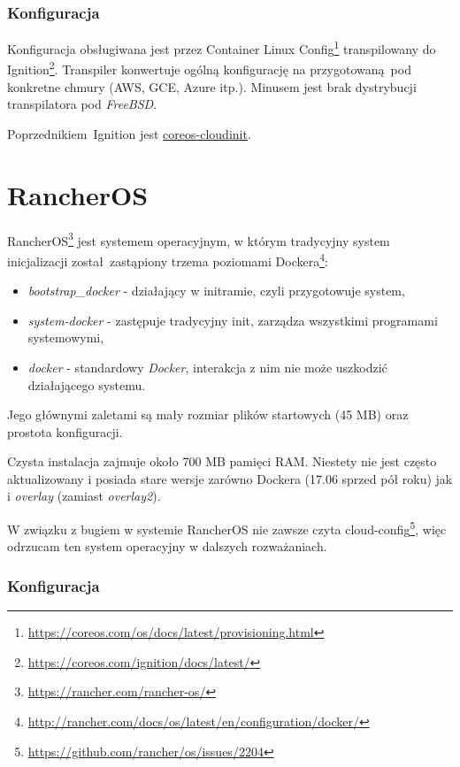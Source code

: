 \documentclass[a4paper,12pt,twoside,openany]{report}
\providecommand{\tightlist}{%
  \setlength{\itemsep}{0pt}\setlength{\parskip}{0pt}}
\DeclareRobustCommand{\href}[2]{#2\footnote{\url{#1}}}
\begin{document}
\hypertarget{konfiguracja}{%
\subsubsection{Konfiguracja}\label{konfiguracja}}

Konfiguracja obsługiwana jest przez
\href{https://coreos.com/os/docs/latest/provisioning.html}{Container
Linux Config} transpilowany do
\href{https://coreos.com/ignition/docs/latest/}{Ignition}. Transpiler
konwertuje ogólną konfigurację na przygotowaną~pod konkretne chmury
(AWS, GCE, Azure itp.). Minusem jest brak dystrybucji transpilatora pod
\emph{FreeBSD}.

Poprzednikiem~Ignition jest
\protect\hyperlink{coreos-cloudinit}{coreos-cloudinit}.

\hypertarget{rancheros}{%
\section{RancherOS}\label{rancheros}}

\href{https://rancher.com/rancher-os/}{RancherOS} jest systemem
operacyjnym, w którym tradycyjny system inicjalizacji został~zastąpiony
\href{http://rancher.com/docs/os/latest/en/configuration/docker/}{trzema
poziomami Dockera}:

\begin{itemize}
\tightlist
\item
  \emph{bootstrap\_docker} - działający w initramie, czyli przygotowuje
  system,
\item
  \emph{system-docker} - zastępuje tradycyjny init, zarządza wszystkimi
  programami systemowymi,
\item
  \emph{docker} - standardowy \emph{Docker}, interakcja z nim nie może
  uszkodzić działającego systemu.
\end{itemize}

Jego głównymi zaletami są mały rozmiar plików startowych (45 MB) oraz
prostota konfiguracji.

Czysta instalacja zajmuje około 700 MB pamięci RAM. Niestety nie jest
często aktualizowany i posiada stare wersje zarówno Dockera (17.06
sprzed pół roku) jak i \emph{overlay} (zamiast \emph{overlay2}).

W związku z bugiem w systemie RancherOS
\href{https://github.com/rancher/os/issues/2204}{nie zawsze czyta
cloud-config}, więc odrzucam ten system operacyjny w dalszych
rozważaniach.

\hypertarget{ros-config}{%
\subsubsection{Konfiguracja}\label{ros-config}}
\end{document}
